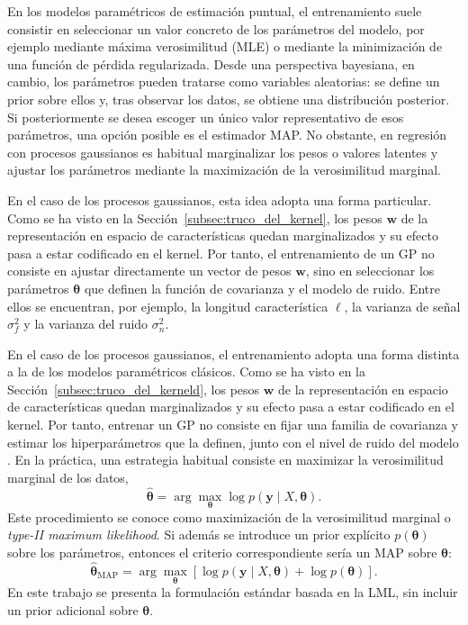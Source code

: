 En los modelos paramétricos de estimación puntual, el entrenamiento suele consistir en
seleccionar un valor concreto de los parámetros del modelo, por ejemplo mediante máxima
verosimilitud (MLE) o mediante la minimización de una función de pérdida regularizada.
Desde una perspectiva bayesiana, en cambio, los parámetros pueden tratarse como variables
aleatorias: se define un prior sobre ellos y, tras observar los datos, se obtiene una
distribución posterior. Si posteriormente se desea escoger un único valor representativo de
esos parámetros, una opción posible es el estimador MAP. No obstante, en regresión con
procesos gaussianos es habitual marginalizar los pesos o valores latentes y ajustar los
parámetros mediante la maximización de la verosimilitud marginal.

En el caso de los procesos gaussianos, esta idea adopta una forma particular. Como se ha
visto en la Sección~\ref{subsec:truco_del_kernel}, los pesos \(\bm{w}\) de la representación en
espacio de características quedan marginalizados y su efecto pasa a estar codificado en el
kernel. Por tanto, el entrenamiento de un GP no consiste en ajustar directamente un vector
de pesos \(\bm{w}\), sino en seleccionar los parámetros \(\bm{\theta}\) que definen la función
de covarianza y el modelo de ruido. Entre ellos se encuentran, por ejemplo, la longitud
característica \(\ell\), la varianza de señal \(\sigma_f^2\) y la varianza del ruido
\(\sigma_n^2\).

En el caso de los procesos gaussianos, el entrenamiento adopta una forma distinta a la
de los modelos paramétricos clásicos. Como se ha visto en la
Sección~\ref{subsec:truco_del_kerneld}, los pesos \(\bm{w}\) de la representación en
espacio de características quedan marginalizados y su efecto pasa a estar codificado en el
kernel. Por tanto, entrenar un GP no consiste  en fijar una familia de covarianza y estimar los hiperparámetros que la definen, junto
con el nivel de ruido del modelo \cite{rasmussen2006gpml}. En la práctica, una estrategia habitual consiste en maximizar la
verosimilitud marginal de los datos,
\[
\hat{\bm{\theta}}
=
\arg\max_{\bm{\theta}}
\log p(\bm{y}\mid X,\bm{\theta}).
\]
Este procedimiento se conoce como maximización de la verosimilitud marginal
o \emph{type-II maximum likelihood}. Si además se introduce un prior explícito
\(p(\bm{\theta})\) sobre los parámetros, entonces el criterio correspondiente sería un
MAP sobre \(\bm{\theta}\):
\[
\hat{\bm{\theta}}_{\mathrm{MAP}}
=
\arg\max_{\bm{\theta}}
\left[
\log p(\bm{y}\mid X,\bm{\theta})
+
\log p(\bm{\theta})
\right].
\]
En este trabajo se presenta la formulación estándar basada en la LML,
sin incluir un prior adicional sobre \(\bm{\theta}\).

